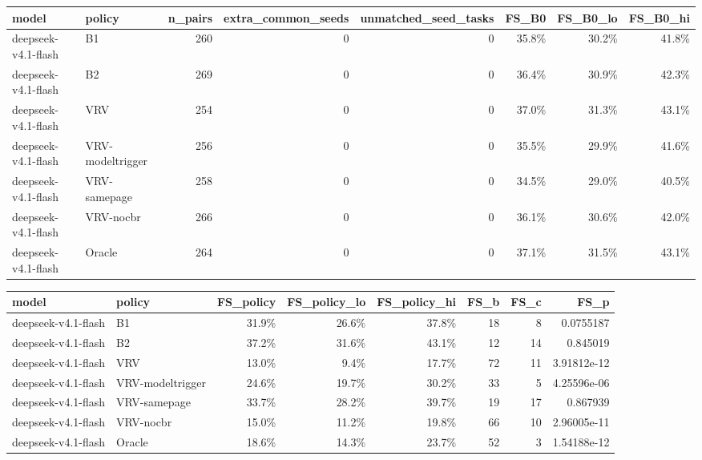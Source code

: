 \begin{tabular}{llrrrrrr}
\toprule
model & policy & n\_pairs & extra\_common\_seeds & unmatched\_seed\_tasks & FS\_B0 & FS\_B0\_lo & FS\_B0\_hi \\
\midrule
deepseek-v4.1-flash & B1 & 260 & 0 & 0 & 35.8\% & 30.2\% & 41.8\% \\
deepseek-v4.1-flash & B2 & 269 & 0 & 0 & 36.4\% & 30.9\% & 42.3\% \\
deepseek-v4.1-flash & VRV & 254 & 0 & 0 & 37.0\% & 31.3\% & 43.1\% \\
deepseek-v4.1-flash & VRV-modeltrigger & 256 & 0 & 0 & 35.5\% & 29.9\% & 41.6\% \\
deepseek-v4.1-flash & VRV-samepage & 258 & 0 & 0 & 34.5\% & 29.0\% & 40.5\% \\
deepseek-v4.1-flash & VRV-nocbr & 266 & 0 & 0 & 36.1\% & 30.6\% & 42.0\% \\
deepseek-v4.1-flash & Oracle & 264 & 0 & 0 & 37.1\% & 31.5\% & 43.1\% \\
\bottomrule
\end{tabular}

\begin{tabular}{llrrrrrr}
\toprule
model & policy & FS\_policy & FS\_policy\_lo & FS\_policy\_hi & FS\_b & FS\_c & FS\_p \\
\midrule
deepseek-v4.1-flash & B1 & 31.9\% & 26.6\% & 37.8\% & 18 & 8 & 0.0755187 \\
deepseek-v4.1-flash & B2 & 37.2\% & 31.6\% & 43.1\% & 12 & 14 & 0.845019 \\
deepseek-v4.1-flash & VRV & 13.0\% & 9.4\% & 17.7\% & 72 & 11 & 3.91812e-12 \\
deepseek-v4.1-flash & VRV-modeltrigger & 24.6\% & 19.7\% & 30.2\% & 33 & 5 & 4.25596e-06 \\
deepseek-v4.1-flash & VRV-samepage & 33.7\% & 28.2\% & 39.7\% & 19 & 17 & 0.867939 \\
deepseek-v4.1-flash & VRV-nocbr & 15.0\% & 11.2\% & 19.8\% & 66 & 10 & 2.96005e-11 \\
deepseek-v4.1-flash & Oracle & 18.6\% & 14.3\% & 23.7\% & 52 & 3 & 1.54188e-12 \\
\bottomrule
\end{tabular}

